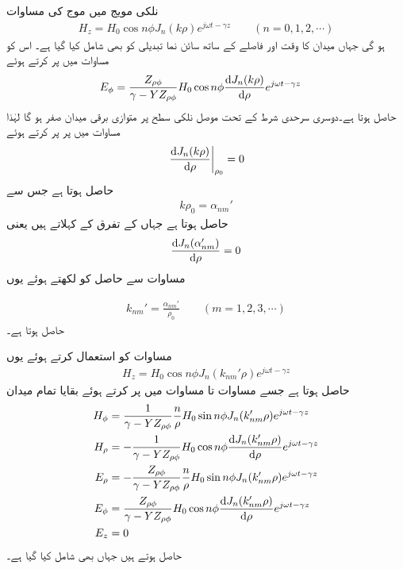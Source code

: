 نلکی مویج میں موج کی مساوات
\begin{align}\label{مساوات_مویج_نلکی_حل_پ}
H_z=H_0  \cos n \phi  J_n(k \rho) e^{j\omega t -\gamma z}  \quad \quad (n=0,1,2,\cdots)
\end{align}
ہو گی جہاں میدان کا وقت اور فاصلے کے ساتھ سائن نما تبدیلی کو بھی شامل کیا گیا ہے۔ اس کو مساوات  میں پر کرتے ہوئے 
\begin{align}
E_{\phi}&=\frac{Z_{\rho \phi}}{\gamma-YZ_{\rho \phi}}H_0  \cos n \phi  \frac{\dif J_n(k \rho)}{\dif \rho} e^{j\omega t -\gamma z}\label{مساوات_مویج_حل_تقریباً_مکمل}
\end{align}
حاصل ہوتا ہے۔دوسری سرحدی  شرط کے تحت موصل نلکی سطح پر متوازی برقی میدان صفر ہو گا لہٰذا  مساوات  میں  پر  پر کرتے ہوئے
\begin{align}
 \left. \frac{\dif J_n(k \rho)}{\dif \rho}\right|_{\rho_0}=0
\end{align}
حاصل ہوتا ہے جس سے
\begin{align}\label{مساوات_مویج_مستقل_بمطابق_شرط_الف}
k \rho_0=\alpha_{nm}'
\end{align}
حاصل ہوتا ہے جہاں   کے تفرق کے   کہلاتے ہیں یعنی
\begin{align}
 \frac{\dif  J_n(\alpha_{nm}')}{\dif \rho}=0
\end{align}
مساوات  سے حاصل  کو  لکھتے ہوئے یوں


\begin{align}\label{مساوات_مویج_مستقل_بمطابق_شرط}
k_{nm}'=\frac{\alpha_{nm}'}{\rho_0} \quad \quad (m=1,2,3,\cdots)
\end{align}
حاصل ہوتا ہے۔ 

مساوات  کو استعمال کرتے ہوئے یوں
 \begin{align}\label{مساوات_مویج_نلکی_حل_ت}
H_z=H_0  \cos n \phi  J_n(k_{nm}'\rho) e^{j\omega t -\gamma z} 
\end{align} 
حاصل ہوتا ہے جسے  مساوات  تا مساوات  میں پر کرتے ہوئے بقایا تمام میدان
\begin{align}
H_{\phi}&=\frac{1}{\gamma-YZ_{\rho \phi}} \frac{n}{\rho} H_0 \sin n\phi J_n(k_{nm}'\rho)e^{j\omega t-\gamma z}  \\
H_{\rho}&=-\frac{1}{\gamma-YZ_{\rho \phi}}H_0  \cos n \phi \frac{\dif  J_n(k_{nm}' \rho)}{\dif \rho} e^{j\omega t -\gamma z} \\
E_{\rho}&=-\frac{Z_{\rho \phi}}{\gamma-YZ_{\rho \phi}} \frac{n}{\rho}H_0  \sin n \phi  J_n(k_{nm}' \rho) e^{j\omega t -\gamma z}\\
E_{\phi}&=\frac{Z_{\rho \phi}}{\gamma-YZ_{\rho \phi}}H_0  \cos n \phi  \frac{\dif J_n(k_{nm}' \rho)}{\dif \rho} e^{j\omega t -\gamma z}\\
E_z&=0
\end{align}
حاصل ہوتے ہیں جہاں  بھی شامل کیا گیا ہے۔

